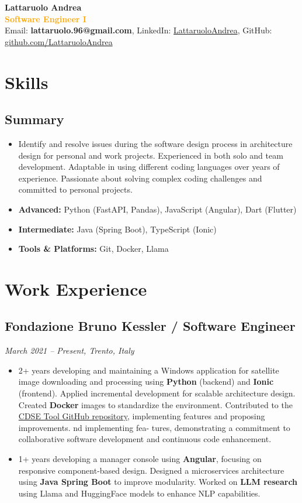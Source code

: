\documentclass[a4paper,10pt]{article}
\begin{document}
{\LARGE \textbf{Lattaruolo Andrea}} \\[0.5em]
{\LARGE\textcolor{orange}{\textbf{Software Engineer I}}} \\[0.5em]
Email: \textbf{lattaruolo.96@gmail.com}, LinkedIn: \href{https://www.linkedin.com/in/andrea-lattaruolo-64a8a7170}{LattaruoloAndrea}, GitHub: \href{https://github.com/LattaruoloAndrea}{github.com/LattaruoloAndrea}

\section*{Skills}
\subsection*{Summary}
\begin{itemize}[leftmargin=1.2em]
    \item Identify and resolve issues during the software design process in architecture design for personal and work projects. Experienced in both solo and team development. Adaptable in using different coding languages over years of experience. Passionate about solving complex coding challenges and committed to personal projects.
    \item \textbf{Advanced:} Python (FastAPI, Pandas), JavaScript (Angular), Dart (Flutter)
    \item \textbf{Intermediate:} Java (Spring Boot), TypeScript (Ionic)
    \item \textbf{Tools \& Platforms:} Git, Docker, Llama
\end{itemize}

\section*{Work Experience}
\subsection*{Fondazione Bruno Kessler / Software Engineer}
\textit{March 2021 -- Present, Trento, Italy}
\begin{itemize}[leftmargin=1.2em]
    \item 2+ years developing and maintaining a Windows application for satellite image downloading and processing using \textbf{Python} (backend) and \textbf{Ionic} (frontend).
    Applied incremental development for scalable architecture design. Created \textbf{Docker} images to standardize the environment.
    Contributed to the \href{https://github.com/CDSETool/CDSETool}{CDSE Tool GitHub repository}, implementing features and proposing improvements. nd implementing fea-
tures, demonstrating a commitment to collaborative software development and continuous code
enhancement.
    \item 1+ years developing a manager console using \textbf{Angular}, focusing on responsive component-based design.
    Designed a microservices architecture using \textbf{Java Spring Boot} to improve modularity.
    Worked on \textbf{LLM research} using Llama and HuggingFace models to enhance NLP capabilities.
\end{itemize}
\end{document}
